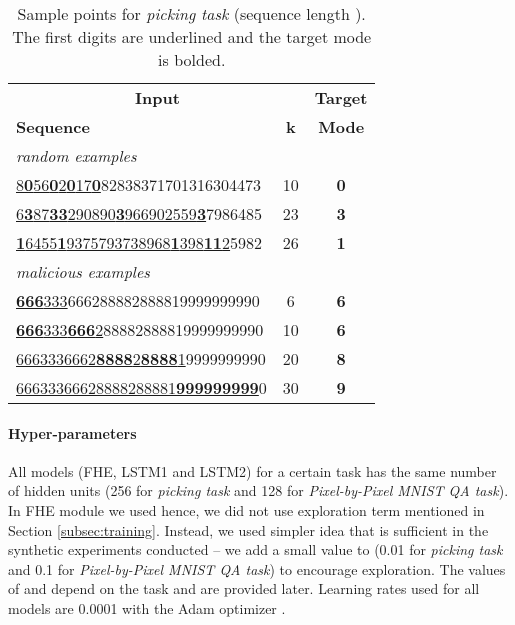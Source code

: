 \begin{table}[ht!]
\vskip -0.1in
\caption{Sample points for \emph{picking task} (sequence length \mbox{}). The first  digits are underlined and the target mode is bolded.}
\label{table:pickingSample}
\vskip 0.1in
\begin{center}
\begin{small}
\begin{sc}
\begin{tabular}{l c | c} 
\toprule
\multicolumn{2}{c|}{\textbf{Input}} & \textbf{Target}\\
\textbf{Sequence} & \textbf{k} & \textbf{Mode}\\
\midrule
\textit{random examples} &&\\
\underline{8\textbf{0}56\textbf{0}2\textbf{0}17\textbf{0}}82838371701316304473 & 10 & \textbf{0}\\
\underline{6\textbf{3}87\textbf{33}290890\textbf{3}966902559\textbf{3}}7986485 & 23 & \textbf{3}\\
\underline{\textbf{1}6455\textbf{1}9375793738968\textbf{1}398\textbf{11}2}5982 & 26 & \textbf{1}\\
\midrule
\textit{malicious examples} &&\\
\underline{\textbf{666}333}666288882888819999999990 & 6 & \textbf{6}\\
\underline{\textbf{666}333\textbf{666}2}88882888819999999990 & 10 & \textbf{6}\\
\underline{6663336662\textbf{8888}2\textbf{8888}1}9999999990 & 20 & \textbf{8}\\
\underline{66633366628888288881\textbf{999999999}}0 & 30 & \textbf{9}\\
\bottomrule
\end{tabular}
\end{sc}
\end{small}
\end{center}
\vskip -0.25in
\end{table}

\paragraph{Hyper-parameters} All models (FHE, LSTM1 and LSTM2) for a certain task has the same number of hidden units (256 for \emph{picking task} and 128 for \emph{Pixel-by-Pixel MNIST QA task}).
In FHE module we used  hence, we did not use exploration term mentioned in Section \ref{subsec:training}. Instead, we used simpler idea that is sufficient in the  synthetic experiments conducted -- we add a small value to  (0.01 for \emph{picking task} and 0.1 for \emph{Pixel-by-Pixel MNIST QA task}) to encourage exploration. The values of  and  depend on the task and are provided later. Learning rates used for all models are 0.0001 with the Adam optimizer \cite{kingmaandba2014}.

